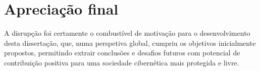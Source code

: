 \section{Apreciação final}
A disrupção foi certamente o combustível de motivação para o desenvolvimento desta dissertação, que, numa perspetiva global, cumpriu os objetivos inicialmente propostos, permitindo extrair conclusões e desafios futuros com potencial de contribuição positiva para uma sociedade cibernética mais protegida e livre.